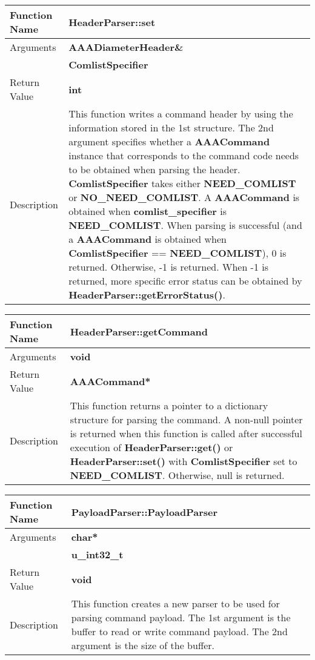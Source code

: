 \begin{flushleft}
\begin{tabular}[t]{|l|p{3in}|}\hline
 Function Name & {\bf HeaderParser::set} \\\hline 
Arguments & {\bf AAADiameterHeader\&} \\\cline{2-2} 
          & {\bf ComlistSpecifier} \\\hline
Return Value & {\bf int} \\\hline 
Description & This function writes a
 command header by using the information stored in the 1st structure.  The 2nd
 argument specifies whether a {\bf AAACommand} instance that corresponds
 to the command code needs to be obtained when parsing the header.  {\bf
 ComlistSpecifier} takes either {\bf NEED\_COMLIST} or {\bf
 NO\_NEED\_COMLIST}.  A {\bf AAACommand} is obtained when {\bf
 comlist\_specifier} is {\bf NEED\_COMLIST}.  When parsing is successful
 (and a {\bf AAACommand} is obtained when {\bf ComlistSpecifier} ==
 {\bf NEED\_COMLIST}), 0 is returned.  Otherwise, -1 is returned.
 When -1 is returned, more specific error status can be obtained by 
 {\bf HeaderParser::getErrorStatus()}.
\\\hline
\end{tabular}
\end{flushleft}

\begin{flushleft}
\begin{tabular}[t]{|l|p{3in}|}\hline
 Function Name & {\bf HeaderParser::getCommand} \\\hline 
Arguments & {\bf void} \\\hline
Return Value & {\bf AAACommand*} \\\hline 
Description & This function returns a pointer to a 
dictionary structure for parsing the command.  A non-null pointer 
is returned when this function is called after successful execution 
of {\bf HeaderParser::get()} or {\bf HeaderParser::set()} 
with {\bf ComlistSpecifier} set to {\bf NEED\_COMLIST}.
Otherwise, null is returned.
\\\hline
\end{tabular}
\end{flushleft}

\begin{flushleft}
\begin{tabular}[t]{|l|p{3in}|}\hline
 Function Name & {\bf PayloadParser::PayloadParser}
\\\hline
 Arguments & {\bf char*}
\\\cline{2-2}
           & {\bf u\_int32\_t}
\\\hline
 Return Value & {\bf void}
\\\hline
 Description &  
 This function creates a new parser to be used for parsing command
 payload.  The 1st argument is the buffer to read or write command
 payload.  The 2nd argument is the size of the buffer.
\\\hline
\end{tabular}
\end{flushleft}

